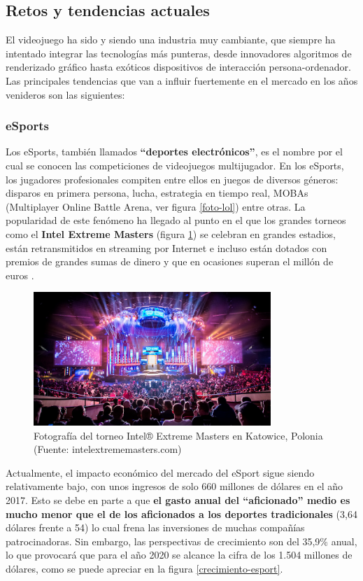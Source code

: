 \subsection{Retos y tendencias actuales}
El videojuego ha sido y siendo una industria muy cambiante, que siempre ha intentado integrar las tecnologías más punteras, desde innovadores algoritmos de renderizado gráfico hasta exóticos dispositivos de interacción persona-ordenador. Las principales tendencias que van a influir fuertemente en el mercado en los años venideros son las siguientes:

\subsubsection{eSports}
Los eSports, también llamados \textbf{``deportes electrónicos''}, es el nombre por el cual se conocen las competiciones de videojuegos multijugador. En los eSports, los jugadores profesionales compiten entre ellos en juegos de diversos géneros: disparos en primera persona, lucha, estrategia en tiempo real, MOBAs (Multiplayer Online Battle Arena, ver figura \ref{foto-lol}) entre otras. La popularidad de este fenómeno ha llegado al punto en el que los grandes torneos como el \textbf{Intel Extreme Masters} (figura \ref{foto-torneo-esport}) se celebran en grandes estadios, están retransmitidos en streaming por Internet e incluso están dotados con premios de grandes sumas de dinero y que en ocasiones superan el millón de euros \cite{libro_blanco}.
\begin{figure}[!t]
    \centering
    \includegraphics[width=0.8\textwidth]{images/estadodelarte/mercado/foto-torneo-esport}
    \caption{Fotografía del torneo Intel® Extreme Masters en Katowice, Polonia (Fuente: intelextrememasters.com)}
    \label{foto-torneo-esport}
\end{figure}

Actualmente, el impacto económico del mercado del eSport sigue siendo relativamente bajo, con unos ingresos de solo 660 millones de dólares en el año 2017. Esto se debe en parte a que \textbf{el gasto anual del ``aficionado'' medio es mucho menor que el de los aficionados a los deportes tradicionales} (3,64 dólares frente a 54) lo cual frena las inversiones de muchas compañías patrocinadoras. Sin embargo, las perspectivas de crecimiento son del 35,9\% anual, lo que provocará que para el año 2020 se alcance la cifra de los 1.504 millones de dólares, como se puede apreciar en la figura \ref{crecimiento-esport}.

